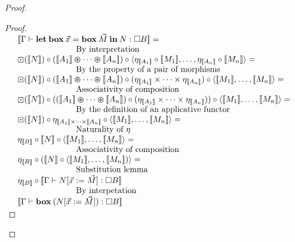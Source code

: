 \documentclass[a4paper]{article}
\begin{document}
\begin{proof}
\begin{proof}
\vspace{\baselineskip}

$\begin{array}{lll}
&[\![\Gamma \vdash {\bf let \: box \:} \vec{x} = {\bf box \:} \vec{M} {\: \bf in \:} N : \Box B]\!] = & \\
&\quad\quad\quad\quad\quad\quad\quad \text{By interpretation}& \\
&\boxdot ([\![N]\!]) \circ ([\![A_1]\!] \varoast \dots \varoast [\![A_n]\!]) \circ \langle \eta_{[\![A_1]\!]} \circ [\![M_1]\!],\dots,\eta_{[\![A_n]\!]} \circ [\![M_n]\!] \rangle = \\
&\quad\quad\quad\quad\quad\quad\quad \text{By the property of a pair of morphisms}& \\
&\boxdot ([\![N]\!]) \circ ([\![A_1]\!] \varoast \dots \varoast [\![A_n]\!]) \circ (\eta_{[\![A_1]\!]} \times \dots \times \eta_{[\![A_n]\!]}) \circ \langle [\![M_1]\!], \dots, [\![M_n]\!]\rangle =& \\
&\quad\quad\quad\quad\quad\quad\quad \text{Associativity of composition}& \\
&\boxdot ([\![N]\!]) \circ (([\![A_1]\!] \varoast \dots \varoast [\![A_n]\!]) \circ (\eta_{[\![A_1]\!]} \times \dots \times \eta_{[\![A_n]\!]})) \circ \langle [\![M_1]\!], \dots, [\![M_n]\!] \rangle =& \\
&\quad\quad\quad\quad\quad\quad\quad \text{By the definition of an applicative functor}& \\
&\boxdot ([\![N]\!]) \circ \eta_{[\![A_1]\!] \times \dots \times [\![A_n]\!]} \circ \langle [\![M_1]\!], \dots, [\![M_n]\!] \rangle =& \\
&\quad\quad\quad\quad\quad\quad\quad \text{Naturality of $\eta$}& \\
&\eta_{[\![B]\!]} \circ [\![N]\!] \circ \langle [\![M_1]\!], \dots, [\![M_n]\!] \rangle =& \\
&\quad\quad\quad\quad\quad\quad\quad \text{Associativity of composition}& \\
&\eta_{[\![B]\!]} \circ ([\![N]\!] \circ \langle [\![M_1]\!], \dots, [\![M_n]\!]) \rangle =& \\
&\quad\quad\quad\quad\quad\quad\quad \text{Substitution lemma}& \\
&\eta_{[\![B]\!]} \circ [\![\Gamma \vdash N [\vec{x} := \vec{M}] : \Box B]\!]& \\
&\quad\quad\quad\quad\quad\quad\quad \text{By interpetation}& \\
&[\![\Gamma \vdash {\bf box \:} (N [\vec{x} := \vec{M}]) : \Box B]\!]&
\end{array}$


\end{proof}
\end{proof}
\end{document}
